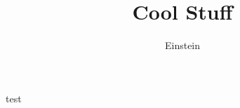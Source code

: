 \documentclass{beamer}
\author{Einstein}
\title{Cool Stuff}
\begin{document}
\begin{frame}
test
\end{frame}
\end{document}

